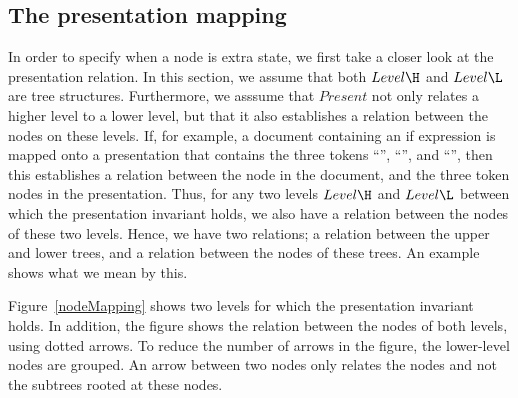 







%																
\subsection{The presentation mapping}\label{mappingsInLayer}


In order to specify when a node is extra state, we first take a closer look at the presentation relation. In this section, we assume that both $Level\H$ and $Level\L$ are tree structures. Furthermore, we asssume that $Present$ not only relates a higher level to a lower level, but that it also establishes a relation between the nodes on these levels. If, for example, a document containing an if expression is mapped onto a presentation that contains the three tokens ``'', ``'', and ``'', then this establishes a relation between the  node in the document, and the three token nodes in the presentation.
Thus, for any two levels $Level\H$ and $Level\L$ between which the presentation invariant holds, we also have a relation between the nodes of these two levels.
\bc Hence, we have two relations; a relation between the upper and lower trees, and a relation between the nodes of these trees. An example shows what we mean by this. \ec

Figure~\ref{nodeMapping} shows two levels for which the presentation invariant holds. In addition, the figure shows the relation between the nodes of both levels, using dotted arrows. To reduce the number of arrows in the figure, the lower-level nodes are grouped. An arrow between two nodes only relates the nodes and not the subtrees rooted at these nodes. %

